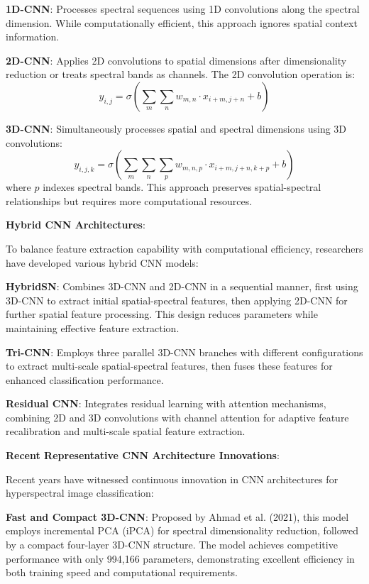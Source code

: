 \documentclass[journal]{IEEEtran}
\begin{document}
\textbf{1D-CNN}: Processes spectral sequences using 1D convolutions along the spectral dimension. While computationally efficient, this approach ignores spatial context information.

\textbf{2D-CNN}: Applies 2D convolutions to spatial dimensions after dimensionality reduction or treats spectral bands as channels. The 2D convolution operation is:
\begin{equation}
y_{i,j} = \sigma\left(\sum_{m}\sum_{n} w_{m,n} \cdot x_{i+m,j+n} + b\right)
\end{equation}

\textbf{3D-CNN}: Simultaneously processes spatial and spectral dimensions using 3D convolutions:
\begin{equation}
y_{i,j,k} = \sigma\left(\sum_{m}\sum_{n}\sum_{p} w_{m,n,p} \cdot x_{i+m,j+n,k+p} + b\right)
\end{equation}
where $p$ indexes spectral bands. This approach preserves spatial-spectral relationships but requires more computational resources.

\textbf{Hybrid CNN Architectures}:

To balance feature extraction capability with computational efficiency, researchers have developed various hybrid CNN models:

\textbf{HybridSN}: Combines 3D-CNN and 2D-CNN in a sequential manner, first using 3D-CNN to extract initial spatial-spectral features, then applying 2D-CNN for further spatial feature processing. This design reduces parameters while maintaining effective feature extraction.

\textbf{Tri-CNN}: Employs three parallel 3D-CNN branches with different configurations to extract multi-scale spatial-spectral features, then fuses these features for enhanced classification performance.

\textbf{Residual CNN}: Integrates residual learning with attention mechanisms, combining 2D and 3D convolutions with channel attention for adaptive feature recalibration and multi-scale spatial feature extraction.

\textbf{Recent Representative CNN Architecture Innovations}:

Recent years have witnessed continuous innovation in CNN architectures for hyperspectral image classification:

\textbf{Fast and Compact 3D-CNN}: Proposed by Ahmad et al. (2021), this model employs incremental PCA (iPCA) for spectral dimensionality reduction, followed by a compact four-layer 3D-CNN structure. The model achieves competitive performance with only 994,166 parameters, demonstrating excellent efficiency in both training speed and computational requirements.
\end{document}
